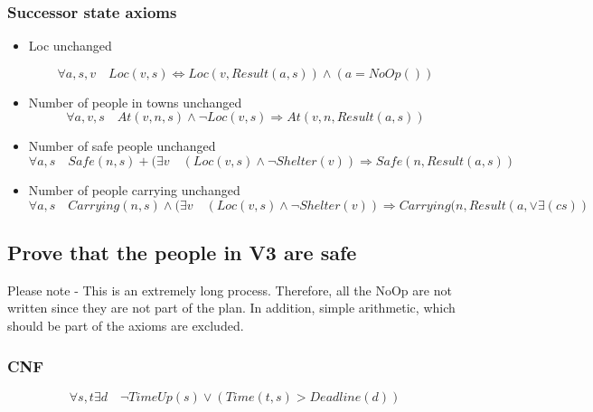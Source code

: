 \documentclass{article}                     %
\newcommand{\nt}[1]{\neg #1}
\begin{document}
	
	\subsubsection{Successor state axioms}
	\begin{itemize}
		\item Loc unchanged
		
		\begin{equation}\label{key}
		\forall a, s, v  \quad Loc(v, s) \Leftrightarrow Loc(v, Result(a, s)) \land (a = NoOp())
		\end{equation}
		
		
		\item Number of people in towns unchanged
		 \begin{equation}\label{key}
		\forall a, v, s\quad  At(v, n, s) \land \nt{Loc(v, s)} \Rightarrow At(v, n, Result(a, s))
		\end{equation} 
		
		\item Number of safe people unchanged
		 \begin{equation}\label{key}
		\forall a, s \quad   Safe(n, s) + (\exists v\quad (Loc(v, s) \land \neg Shelter(v) ) \Rightarrow Safe(n, Result(a, s))
		\end{equation}
		
		\item Number of people carrying unchanged
		 \begin{equation}\label{key}
		\forall a, s \quad Carrying(n, s) \land (\exists v \quad (Loc(v, s) \land \nt{Shelter(v)}) \Rightarrow  Carrying(n, Result(a, ∨ ∃(cs))
		\end{equation}
	\end{itemize}
	

	\subsection{Prove that the people in V3 are safe}

	Please note - This is an extremely long process. Therefore, all the NoOp are not written since they are not part of the plan. In addition, simple arithmetic, which should be part of the axioms are excluded. 
	\subsubsection{CNF}
	
	\begin{equation}\label{cnf:timeup}
	\forall s, t \exists d \quad \neg TimeUp(s) \lor (Time(t, s) > Deadline(d))
	\end{equation}	
	
\end{document}
